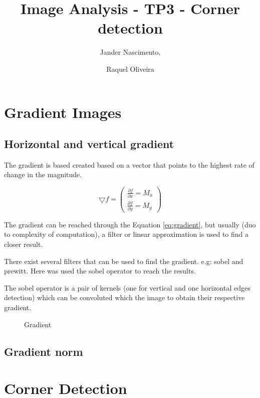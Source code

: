 \documentclass{article}
\begin{document}
\title{Image Analysis - TP3 - Corner detection}

\author{Jander Nascimento, 
\and Raquel Oliveira}

\maketitle

\section{Gradient Images}
	
	\subsection{Horizontal and vertical gradient}

	The gradient is based created based on a vector that points to the highest rate of change in the magnitude. 

\begin{equation}
\bigtriangledown f = \begin{pmatrix}
\frac{\partial f}{\partial x} = M_x\\ 
\frac{\partial f}{\partial y} = M_y
\end{pmatrix}
\label{eq:gradient}
\end{equation}

The gradient can be reached through the Equation \ref{eq:gradient}, but usually (duo to complexity of computation), a filter or linear approximation is used to find a closer result.

There exist several filters that can be used to find the gradient. e.g: sobel and prewitt. Here was used the sobel operator to reach the results.

The sobel operator is a pair of kernels (one for vertical and one horizontal edges detection) which can be convoluted which the image to obtain their respective gradient.

	\begin{figure}[H]
	\centering
	\caption{Gradient}
	\label{fig:gradient}
	\end{figure}


	
	\subsection{Gradient norm}


\section{Corner Detection}
\end{document}
